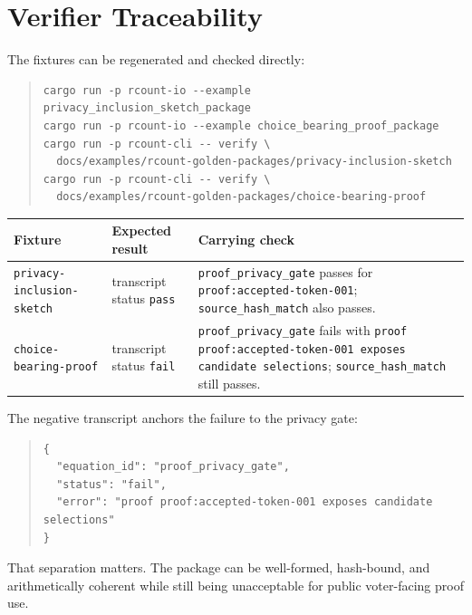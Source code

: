 \section{Verifier Traceability}

The fixtures can be regenerated and checked directly:

\begin{quote}
\footnotesize
\begin{verbatim}
cargo run -p rcount-io --example privacy_inclusion_sketch_package
cargo run -p rcount-io --example choice_bearing_proof_package
cargo run -p rcount-cli -- verify \
  docs/examples/rcount-golden-packages/privacy-inclusion-sketch
cargo run -p rcount-cli -- verify \
  docs/examples/rcount-golden-packages/choice-bearing-proof
\end{verbatim}
\end{quote}

\begin{center}
\small
\begin{tabularx}{\textwidth}{lXX}
\toprule
Fixture & Expected result & Carrying check \\
\midrule
\texttt{privacy-inclusion-sketch} & transcript status \texttt{pass} & \texttt{proof\_privacy\_gate} passes for \texttt{proof:accepted-token-001}; \texttt{source\_hash\_match} also passes. \\
\texttt{choice-bearing-proof} & transcript status \texttt{fail} & \texttt{proof\_privacy\_gate} fails with \texttt{proof proof:accepted-token-001 exposes candidate selections}; \texttt{source\_hash\_match} still passes. \\
\bottomrule
\end{tabularx}
\end{center}

The negative transcript anchors the failure to the privacy gate:
\begin{quote}
\footnotesize
\begin{verbatim}
{
  "equation_id": "proof_privacy_gate",
  "status": "fail",
  "error": "proof proof:accepted-token-001 exposes candidate selections"
}
\end{verbatim}
\end{quote}

That separation matters. The package can be well-formed, hash-bound, and
arithmetically coherent while still being unacceptable for public voter-facing
proof use.
